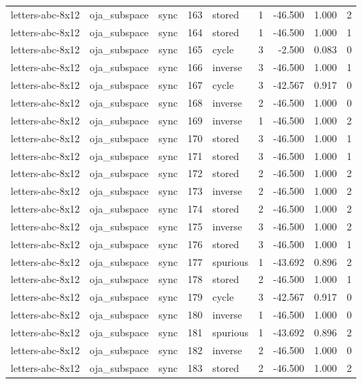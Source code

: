 \begin{tabular}{lllrlrrrr}
letters-abc-8x12 & oja\_subspace & sync & 163 & stored & 1 & -46.500 & 1.000 & 2 \\
letters-abc-8x12 & oja\_subspace & sync & 164 & stored & 1 & -46.500 & 1.000 & 1 \\
letters-abc-8x12 & oja\_subspace & sync & 165 & cycle & 3 & -2.500 & 0.083 & 0 \\
letters-abc-8x12 & oja\_subspace & sync & 166 & inverse & 3 & -46.500 & 1.000 & 1 \\
letters-abc-8x12 & oja\_subspace & sync & 167 & cycle & 3 & -42.567 & 0.917 & 0 \\
letters-abc-8x12 & oja\_subspace & sync & 168 & inverse & 2 & -46.500 & 1.000 & 0 \\
letters-abc-8x12 & oja\_subspace & sync & 169 & inverse & 1 & -46.500 & 1.000 & 2 \\
letters-abc-8x12 & oja\_subspace & sync & 170 & stored & 3 & -46.500 & 1.000 & 1 \\
letters-abc-8x12 & oja\_subspace & sync & 171 & stored & 3 & -46.500 & 1.000 & 1 \\
letters-abc-8x12 & oja\_subspace & sync & 172 & stored & 2 & -46.500 & 1.000 & 2 \\
letters-abc-8x12 & oja\_subspace & sync & 173 & inverse & 2 & -46.500 & 1.000 & 2 \\
letters-abc-8x12 & oja\_subspace & sync & 174 & stored & 2 & -46.500 & 1.000 & 2 \\
letters-abc-8x12 & oja\_subspace & sync & 175 & inverse & 3 & -46.500 & 1.000 & 2 \\
letters-abc-8x12 & oja\_subspace & sync & 176 & stored & 3 & -46.500 & 1.000 & 1 \\
letters-abc-8x12 & oja\_subspace & sync & 177 & spurious & 1 & -43.692 & 0.896 & 2 \\
letters-abc-8x12 & oja\_subspace & sync & 178 & stored & 2 & -46.500 & 1.000 & 1 \\
letters-abc-8x12 & oja\_subspace & sync & 179 & cycle & 3 & -42.567 & 0.917 & 0 \\
letters-abc-8x12 & oja\_subspace & sync & 180 & inverse & 1 & -46.500 & 1.000 & 0 \\
letters-abc-8x12 & oja\_subspace & sync & 181 & spurious & 1 & -43.692 & 0.896 & 2 \\
letters-abc-8x12 & oja\_subspace & sync & 182 & inverse & 2 & -46.500 & 1.000 & 0 \\
letters-abc-8x12 & oja\_subspace & sync & 183 & stored & 2 & -46.500 & 1.000 & 2 \\

\end{tabular}
